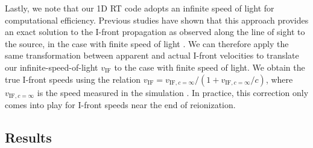 \documentclass[twocolumn]{aastex62}
\newcommand{\vIF}{v_{\mathrm{IF}}}
\begin{document}
{ Lastly, we note that our 1D RT code adopts an infinite speed of light for computational efficiency.  Previous studies have shown that this approach provides an exact solution to the I-front propagation as observed along the line of sight to the source, in the case with finite speed of light \citep{2003AJ....126....1W,2006ApJ...648..922S, 2007MNRAS.374..493B, 2016MNRAS.457.3006D}.  We can therefore apply the same transformation between apparent and actual I-front velocities to translate our infinite-speed-of-light $\vIF$ to the case with finite speed of light.  We obtain the true I-front speeds using the relation $\vIF = v_{\mathrm{IF},c=\infty}/(1+v_{\mathrm{IF},c=\infty}/c)$, where $v_{\mathrm{IF},c=\infty}$ is the speed measured in the simulation \citep{2006ApJ...648..922S}.  In practice, this correction only comes into play for I-front speeds near the end of reionization.}          


\subsection{Results}  
\label{sec:Treion}
\end{document}
